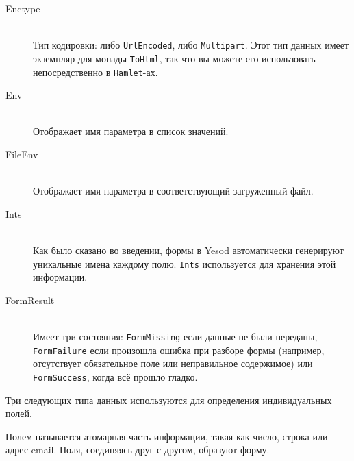 \begin{description}
\item[Enctype] \hfill \\
Тип кодировки: либо \lstinline'UrlEncoded', либо \lstinline'Multipart'. Этот тип данных
имеет экземпляр для монады \lstinline'ToHtml', так что вы можете его использовать
непосредственно в \lstinline'Hamlet'-ах.

\item[Env] \hfill \\
Отображает имя параметра в список значений.

\item[FileEnv] \hfill \\
Отображает имя параметра в соответствующий загруженный файл.

\item[Ints] \hfill \\
Как было сказано во введении, формы в Yesod автоматически генерируют уникальные имена 
каждому полю. \lstinline'Ints' используется для хранения этой информации.

\item[FormResult] \hfill \\
Имеет три состояния: \lstinline'FormMissing' если данные не были переданы,
\lstinline'FormFailure' если произошла ошибка при разборе формы (например, отсутствует
обязательное поле или неправильное содержимое) или \lstinline'FormSuccess', когда всё прошло
гладко.
\end{description}

Три следующих типа данных используются для определения индивидуальных
 полей.

\begin{remark}
Полем называется атомарная часть информации, такая как число, строка или адрес
email. Поля, соединяясь друг с другом, образуют форму.
\end{remark}

